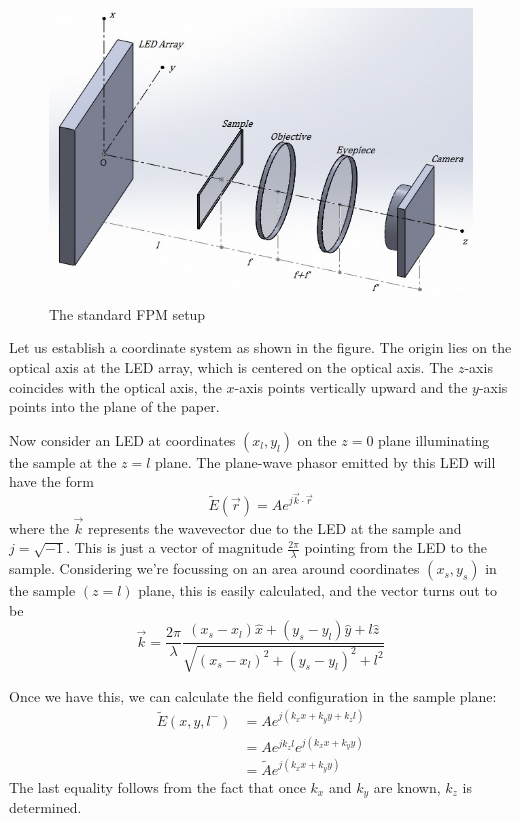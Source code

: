 \documentclass[11pt,a4paper,journal]{IEEEtran}
\begin{document}
\begin{figure}
  \caption{The standard FPM setup}
  \centering
    \includegraphics[scale=0.5]{FPM_Setup}
\end{figure}

Let us establish a coordinate system as shown in the figure. The origin lies on the optical axis at the LED array, which is centered on the optical axis. The $z$-axis coincides with the optical axis, the $x$-axis points vertically upward and the $y$-axis points into the plane of the paper.

Now consider an LED at coordinates $(x_l, y_l)$ on the $z=0$ plane illuminating the sample at the $z=l$ plane. The plane-wave phasor emitted by this LED will have the form
\begin{equation}
\tilde{E}(\vec{r}) = A e^{j \vec{k} \cdot \vec{r}}
\end{equation}
where the $\vec{k}$ represents the wavevector due to the LED at the sample and $j=\sqrt{-1}$. This is just a vector of magnitude $\frac{2\pi}{\lambda}$ pointing from the LED to the sample. Considering we're focussing on an area around coordinates $(x_s, y_s)$ in the sample $(z=l)$ plane, this is easily calculated, and the vector turns out to be
\begin{equation}
\vec{k} = \frac{2\pi}{\lambda} \frac{(x_s-x_l)\hat{x}+(y_s-y_l)\hat{y}+l\hat{z}}{\sqrt{(x_s-x_l)^2+(y_s-y_l)^2+l^2}}
\end{equation}

Once we have this, we can calculate the field configuration in the sample plane:
\begin{equation}
\begin{split}
\tilde{E}(x, y, l^-) & = A e^{j(k_x x + k_y y + k_z l)} \\
				   & = Ae^{jk_z l} e^{j(k_x x + k_y y)} \\
				   & = \tilde{A} e^{j(k_x x + k_y y)}
\end{split}
\end{equation}
The last equality follows from the fact that once $k_x$ and $k_y$ are known, $k_z$ is determined.
\end{document}
